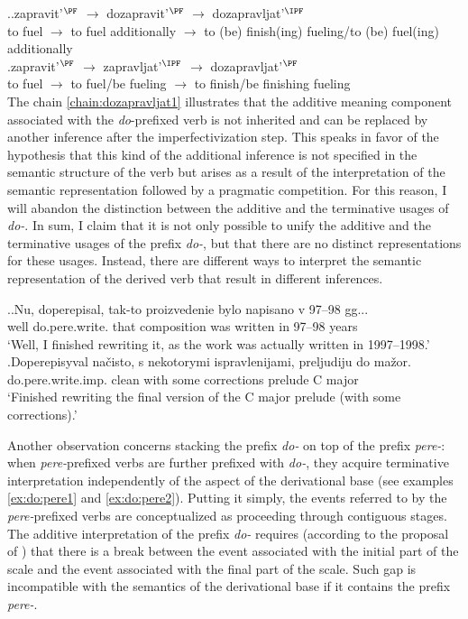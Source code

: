 \ex.\label{chain:dozapravljat}\ag.\label{chain:dozapravljat1}zapravit'$^{\PF}$ $\rightarrow$ dozapravit'$^{\PF}$ $\rightarrow$ dozapravljat'$^{\IPF}$\\
{to fuel} $\rightarrow$ {to fuel additionally} $\rightarrow$ {to (be) finish(ing) fueling/to (be) fuel(ing) additionally}\\
\bg.\label{chain:dozapravljat2}zapravit'$^{\PF}$ $\rightarrow$ zapravljat'$^{\IPF}$ $\rightarrow$ dozapravljat'$^{\PF}$\\
{to fuel} $\rightarrow$ {to fuel/be fueling} $\rightarrow$ {to finish/be finishing fueling}\\

The chain \ref{chain:dozapravljat1} illustrates that the additive meaning component associated with the \textit{do}-prefixed verb is not inherited and can be replaced by another inference after the imperfectivization step. This speaks in favor of the hypothesis that this kind of the additional inference is not specified in the semantic structure of the verb but arises as a result of the interpretation of the semantic representation followed by a pragmatic competition. For this reason, I will abandon the distinction between the additive and the terminative usages of \textit{do-}. In sum, I claim that it is not only possible to unify the additive and the terminative usages of the prefix \textit{do-}, but that there are no distinct representations for these usages. Instead, there are different ways to interpret the semantic representation of the derived verb that result in different inferences. 

\ex.\ag.\label{ex:do:pere1}Nu, doperepisal, tak-to proizvedenie bylo napisano v 97--98 gg...\\
well do.pere.write. that composition was written in 97--98 years\\
\trans `Well, I finished rewriting it, as the work was actually written in 1997--1998.'
\bg.\label{ex:do:pere2}Doperepisyval na\v{c}isto, s nekotorymi ispravlenijami, preljudiju do ma\v{z}or.\\
do.pere.write.imp. clean with some corrections prelude C major\\
\trans `Finished rewriting the final version of the C major prelude (with some corrections).'

Another observation concerns stacking the prefix \textit{do-} on top of the prefix  \textit{pere-}: when \textit{pere-}prefixed verbs are further prefixed with \textit{do-}, they acquire terminative interpretation independently of the aspect of the derivational base (see examples \ref{ex:do:pere1} and \ref{ex:do:pere2}). Putting it simply, the events referred to by the \textit{pere-}prefixed verbs are conceptualized as proceeding through contiguous stages. The additive interpretation of the prefix \textit{do-} requires (according to the proposal of \citet{Kagan:book}) that there is a break between the event associated with the initial part of the scale and the event associated with the final part of the scale. Such gap is incompatible with the semantics of the derivational base if it contains the prefix \textit{pere-}. 

